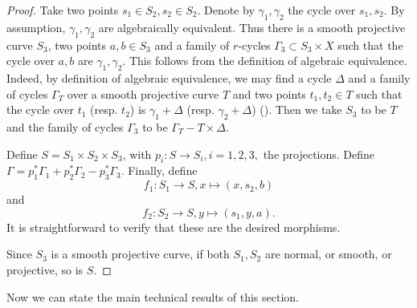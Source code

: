 \documentclass{amsart}
\theoremstyle{definition}
\theoremstyle{remark}
\begin{document}
\begin{proof}
Take two points $s_1 \in S_2, s_2 \in S_2$. Denote by $\gamma_1, \gamma_2$ the cycle over $s_1, s_2$.
By assumption, $\gamma_1, \gamma_2$ are algebraically equivalent.
Thus there is a smooth projective curve $S_3$, two points $a, b \in S_3$ and a family of $r$-cycles $\Gamma_3 \subset S_3 \times X$ such that the cycle over $a, b$ are $\gamma_1, \gamma_2$.
This follows from the definition of algebraic equivalence. Indeed, by definition of algebraic equivalence, we may find a cycle $\Delta$ and a family of cycles $\Gamma_T$ over a smooth projective curve $T$ and two points $t_1, t_2 \in T$ such that the cycle over $t_1$ (resp. $t_2$) is $\gamma_1+\Delta$ (resp. $\gamma_2+\Delta$) (\cite[Example 10.3.2]{Fulton98}). Then we take $S_3$ to be $T$ and the family of cycles $\Gamma_3$ to be $\Gamma_T-T \times \Delta$.

Define $S=S_1 \times S_2 \times S_3$, with $p_i: S \to S_i, i=1, 2, 3,$ the projections. Define $\Gamma=p_1^*\Gamma_1+p_2^*\Gamma_2-p_3^*\Gamma_3$.
Finally, define 
\[
f_1: S_1 \to S, x \mapsto (x, s_2, b) 
\]
and \[
f_2: S_2 \to S, y \mapsto (s_1, y, a).
\]
It is straightforward to verify that these are the desired morphisms.

Since $S_3$ is a smooth projective curve, if both $S_1, S_2$ are normal, or smooth, or projective, so is $S$.
\end{proof}


Now we can state the main technical results of this section.
\end{document}
